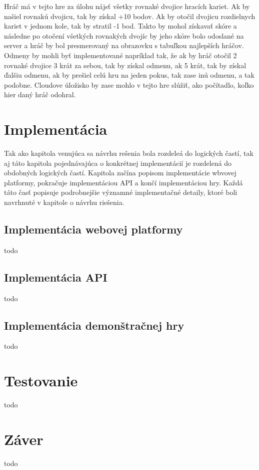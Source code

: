 Hráč má v tejto hre za úlohu nájsť všetky rovnaké dvojice hracích kariet. Ak by našiel rovnakú dvojicu, tak by získal +10 bodov.  Ak by otočil dvojicu rozdielnych kariet v jednom kole, tak by stratil -1 bod. Takto by mohol získavať skóre a následne po otočení všetkých rovnakých dvojíc by jeho skóre bolo odoslané na server a hráč by bol presmerovaný na obrazovku s tabuľkou najlepších hráčov. Odmeny by mohli byť implementované napríklad tak, že ak by hráč otočil 2 rovnaké dvojice 3 krát za sebou, tak by získal odmenu, ak 5 krát, tak by získal ďalšiu odmenu, ak by prešiel celú hru na jeden pokus, tak zase inú odmenu, a tak podobne. Cloudove úložisko by zase mohlo v tejto hre slúžiť, ako počítadlo, koľko hier daný hráč odohral. 

\chapter{Implementácia}
\label{chap:implementacia}
Tak ako kapitola venujúca sa návrhu rešenia bola rozdeleá do logických častí, tak aj táto kapitola pojednávajúca o konkrétnej implementácií je rozdelená do obdobných logických častí. Kapitola začína popisom implementácie wbvovej platformy, pokračuje implementáciou API a končí implementáciou hry.  Každá táto časť popisuje podrobnejšie významné implementačné detaily, ktoré boli navrhnuté v kapitole o návrhu riešenia. 

\section{Implementácia webovej platformy}
todo

\section{Implementácia API}
todo

\section{Implementácia demonštračnej hry}
todo

\chapter{Testovanie}
\label{chap:testovanie}
todo

\chapter{Záver}
\label{chap:zaver}
todo












